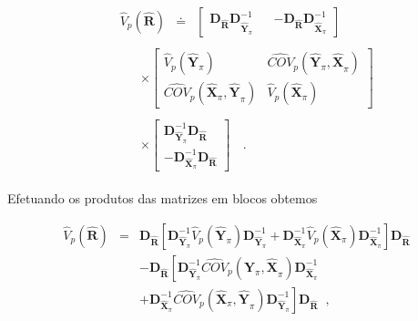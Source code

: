 \documentclass[]{book}
\theoremstyle{definition}
\theoremstyle{definition}
\theoremstyle{definition}
\theoremstyle{remark}
\begin{document}
\begin{eqnarray*}
&& 
\begin{array}{lll}
\widehat{V}_{p}\left( \widehat{\mathbf{R}}\right) & \doteq & \left[ 
\begin{array}{lll}
\mathbf{\mathbf{D}_{\widehat{\mathbf{R}}}D}_{\mathbf{\hat{Y}}_{\pi }}^{-1} & 
\left. {}\right. & \mathbf{-\mathbf{D}_{\widehat{\mathbf{R}}}D}_{\mathbf{\hat{X}}_{\pi }}^{-1}
\end{array}
\right]
\end{array}
\\
&& 
\begin{array}{lll}
&  & \times \left[ 
\begin{array}{cc}
\widehat{V}_{p}\left( \mathbf{\hat{Y}}_{\pi }\right) & \widehat{COV}_{p}\left( \mathbf{\hat{Y}}_{\pi }\mathbf{,\hat{X}}_{\pi }\right) \\ 
\widehat{COV}_{p}\left( \mathbf{\hat{X}}_{\pi }\mathbf{,\hat{Y}}_{\pi
}\right) & \widehat{V}_{p}\left( \mathbf{\hat{X}}_{\pi }\right)
\end{array}
\right]
\end{array}
\\
&& 
\begin{array}{lll}
&  & \times \left[ 
\begin{array}{l}
\mathbf{D}_{\mathbf{\hat{Y}}_{\pi }}^{-1}\mathbf{\mathbf{D}_{\widehat{
\mathbf{R}}}} \\ 
-\mathbf{D}_{\mathbf{\hat{X}}_{\pi }}^{-1}\mathbf{\mathbf{D}_{\widehat{
\mathbf{R}}}}
\end{array}
\right]
\end{array}
\;\;.
\end{eqnarray*}

Efetuando os produtos das matrizes em blocos obtemos

\begin{eqnarray}
\widehat{V}_{p}\left( \widehat{\mathbf{R}}\right) &=&\mathbf{\mathbf{D}_{
\widehat{\mathbf{R}}}}\left[ \mathbf{D}_{\mathbf{\hat{Y}}_{\pi }}^{-1}%
\widehat{V}_{p}\left( \mathbf{\hat{Y}}_{\pi }\right) \mathbf{D}_{\mathbf{
\hat{Y}}_{\pi }}^{-1}+\mathbf{D}_{\mathbf{\hat{X}}_{\pi }}^{-1}\widehat{V}
_{p}\left( \mathbf{\hat{X}}_{\pi }\right) \mathbf{D}_{\mathbf{\hat{X}}_{\pi
}}^{-1}\right] \mathbf{\mathbf{D}_{\widehat{\mathbf{R}}}}  \nonumber \\
&&-\mathbf{\mathbf{D}_{\widehat{\mathbf{R}}}}\left[ \mathbf{D}_{\mathbf{\hat{
Y}}_{\pi }}^{-1}\widehat{COV}_{p}\left( \mathbf{\hat{Y}}_{\pi }\mathbf{,\hat{
X}}_{\pi }\right) \mathbf{D}_{\mathbf{\hat{X}}_{\pi }}^{-1}\right.
\label{eq:estpa22} \\
&&+\left. \mathbf{D}_{\mathbf{\hat{X}}_{\pi }}^{-1}\widehat{COV}_{p}\left( 
\mathbf{\hat{X}}_{\pi }\mathbf{,\hat{Y}}_{\pi }\right) \mathbf{D}_{\mathbf{
\hat{Y}}_{\pi }}^{-1}\right] \mathbf{\mathbf{D}_{\widehat{\mathbf{R}}}}\;\;
\mbox{,}  \nonumber
\end{eqnarray}
\end{document}
